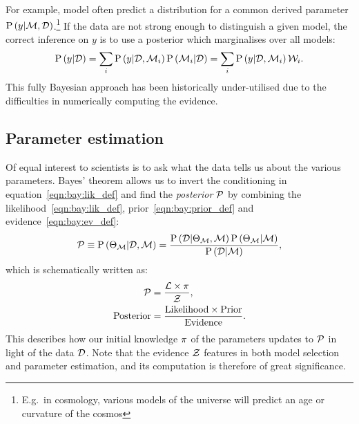 For example, model often predict a distribution for a common derived parameter $\mathrm{P}\left(y\middle|\mathcal{M},\mathcal{D}\right)$.\footnote{E.g.\ in cosmology, various models of the universe will predict an age or curvature of the cosmos} If the data are not strong enough to distinguish a given model, the correct inference on $y$ is to use a posterior which marginalises over all models:
\begin{equation}
  \mathrm{P}\left(y\middle|\mathcal{D}\right) 
  = \sum_i\mathrm{P}\left(y\middle|\mathcal{D},\mathcal{M}_i\right)\mathrm{P}\left(\mathcal{M}_i\middle|\mathcal{D}\right)
  = \sum_i\mathrm{P}\left(y\middle|\mathcal{D},\mathcal{M}_i\right)\mathcal{W}_i.
\end{equation}
This fully Bayesian approach has been historically under-utilised due to the difficulties in numerically computing the evidence.



\subsection{Parameter estimation}
Of equal interest to scientists is to ask what the data tells us about the various parameters.  
Bayes' theorem allows us to invert the conditioning in equation~\eqref{eqn:bay:lik_def} and find the {\em posterior\/} $\mathcal{P}$ by combining the likelihood~\eqref{eqn:bay:lik_def}, prior~\eqref{eqn:bay:prior_def} and evidence~\eqref{eqn:bay:ev_def}:
%
\begin{equation}
  \mathcal{P}\equiv
  \mathrm{P}\left(\Theta_{\mathcal{M}}\middle|\mathcal{D},\mathcal{M}\right) = \frac{\mathrm{P}\left(\mathcal{D}\middle|\Theta_{\mathcal{M}},\mathcal{M}\right) \mathrm{P}\left(\Theta_{\mathcal{M}}\middle|\mathcal{M}\right)}{\mathrm{P}\left(\mathcal{D}\middle|\mathcal{M}\right)},
  \label{eqn:bay:bayes_theorem}
\end{equation}
%
which is schematically written as:
\begin{align}
  \mathcal{P} &= \frac{\mathcal{L} \times \pi }{\mathcal{Z} },
  \label{eqn:bay:bayes_theorem_abbrv}\\
  \mathrm{Posterior} &= \frac{\mathrm{Likelihood} \times \mathrm{Prior} }{\mathrm{Evidence} }.
\end{align}
This describes how our initial knowledge $\pi$ of the parameters updates to $\mathcal{P}$ in light of the data $\mathcal{D}$. Note that the evidence $\mathcal{Z}$ features in both model selection and parameter estimation, and its computation is therefore of great significance.







